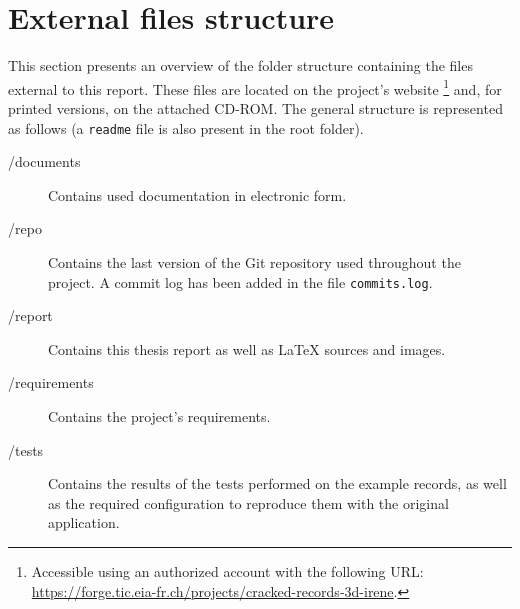 
\chapter{External files structure}
\label{chap:arch-content}

This section presents an overview of the folder structure containing the files external to this report. These files are located on the project's website \footnote{Accessible using an authorized account with the following URL: \url{https://forge.tic.eia-fr.ch/projects/cracked-records-3d-irene}.} and, for printed versions, on the attached CD-ROM. The general structure is represented as follows (a \texttt{readme} file is also present in the root folder).

\begin{description}
\item[/documents] Contains used documentation in electronic form.
\item[/repo] Contains the last version of the Git repository used throughout the project. A commit log has been added in the file \texttt{commits.log}.
\item[/report] Contains this thesis report as well as \LaTeX{} sources and images.
\item[/requirements] Contains the project's requirements.
\item[/tests] Contains the results of the tests performed on the example records, as well as the required configuration to reproduce them with the original application.
\end{description}
